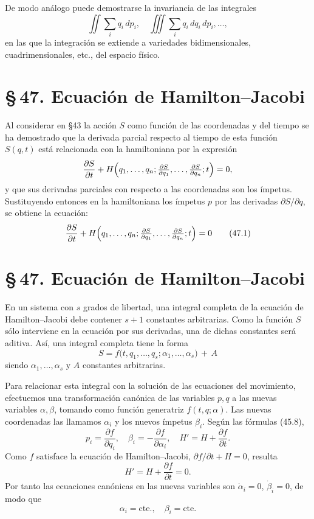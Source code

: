 \documentclass[12pt]{article}
\begin{document}
\noindent De modo análogo puede demostrarse la invariancia de las integrales
\[
\iint\sum_i q_i\,dp_i,\quad
\iiint\sum_i q_i\,dq_i\,dp_i,\dots,
\]
en las que la integración se extiende a variedades bidimensionales, cuadrimensionales, etc., del espacio físico.

\section*{\S\,47. Ecuación de Hamilton–Jacobi}

\noindent Al considerar en \S43 la acción \(S\) como función de las coordenadas y del tiempo se ha demostrado que la derivada parcial respecto al tiempo de esta función \(S(q,t)\) está relacionada con la hamiltoniana por la expresión
\[
\frac{\partial S}{\partial t}
+
H\Bigl(q_1,\dots,q_n;\tfrac{\partial S}{\partial q_1},\dots,\tfrac{\partial S}{\partial q_n};t\Bigr)
=0,
\]
y que sus derivadas parciales con respecto a las coordenadas son los ímpetus. Sustituyendo entonces en la hamiltoniana los ímpetus \(p\) por las derivadas \(\partial S/\partial q\), se obtiene la ecuación:
\begin{equation}
\frac{\partial S}{\partial t}
+
H\Bigl(q_1,\dots,q_n;\tfrac{\partial S}{\partial q_1},\dots,\tfrac{\partial S}{\partial q_n};t\Bigr)
=0
\tag{47.1}
\end{equation}
\section*{\S\,47. Ecuación de Hamilton–Jacobi}

\noindent En un sistema con \(s\) grados de libertad, una integral completa de la ecuación de Hamilton–Jacobi debe contener \(s+1\) constantes arbitrarias. Como la función \(S\) sólo interviene en la ecuación por sus derivadas, una de dichas constantes será aditiva. Así, una integral completa tiene la forma
\begin{equation}
S = f\bigl(t,q_1,\dots,q_s;\alpha_1,\dots,\alpha_s\bigr)\,+\,A
\tag{47.2}
\end{equation}
siendo \(\alpha_1,\dots,\alpha_s\) y \(A\) constantes arbitrarias.

\noindent Para relacionar esta integral con la solución de las ecuaciones del movimiento, efectuemos una transformación canónica de las variables \(p,q\) a las nuevas variables \(\alpha,\beta\), tomando como función generatriz \(f(t,q;\alpha)\). Las nuevas coordenadas las llamamos \(\alpha_i\) y los nuevos ímpetus \(\beta_i\). Según las fórmulas (45.8),
\[
p_i = \frac{\partial f}{\partial q_i},\quad
\beta_i = -\frac{\partial f}{\partial \alpha_i},\quad
H' = H + \frac{\partial f}{\partial t}.
\]
Como \(f\) satisface la ecuación de Hamilton–Jacobi, \(\partial f/\partial t + H = 0\), resulta
\[
H' = H + \frac{\partial f}{\partial t} = 0.
\]
Por tanto las ecuaciones canónicas en las nuevas variables son
\(\dot\alpha_i=0\), \(\dot\beta_i=0\), de modo que
\begin{equation}
\alpha_i = \text{cte.},\quad \beta_i = \text{cte.}
\tag{47.3}
\end{equation}
\end{document}
